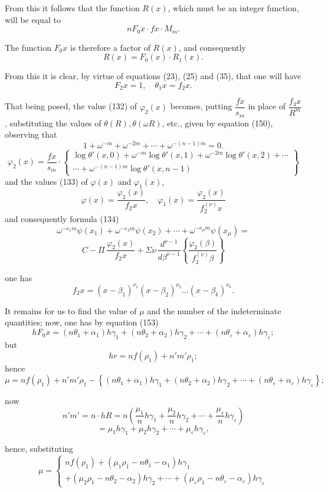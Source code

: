 \documentclass{article}
\begin{document}
From this it follows that the function $R(x)$, which must be an integer function, will be equal to
\[ n F_0 x \cdot f x \cdot M_m. \]

The function $F_0 x$ is therefore a factor of $R(x)$, and consequently
\[ R(x) = F_0(x) \cdot R_1(x). \tag{159} \]

From this it is clear, by virtue of equations (23), (25) and (35), that one will have
\[ F_2 x = 1, \quad \theta_1 x = f_2 x. \tag{160} \]

That being posed, the value (132) of $\varphi_2(x)$ becomes, putting $\dfrac{f x}{s_m}$ in place of $\dfrac{f_3 x}{R^{m}}$, substituting the values of $\theta(R), \theta(\omega R)$, etc., given by equation (150), observing that
\[ 1+\omega^{-m}+\omega^{-2m}+\cdots+\omega^{-(n-1)m} = 0. \]
\[ \varphi_2(x) = \frac{f x}{s_m} \cdot \left\{ \begin{array}{l} \log\theta'(x,0)+\omega^{-m}\log\theta'(x,1)+\omega^{-2m}\log\theta'(x,2)+\cdots \\ \cdots+\omega^{-(n-1)m}\log\theta'(x,n-1) \end{array} \right\} \tag{161} \]
and the values (133) of $\varphi(x)$ and $\varphi_1(x)$,
\[ \varphi(x) = \frac{\varphi_2(x)}{f_2 x}, \quad \varphi_1(x) = \frac{\varphi_2(x)}{f_2^{(\nu)}x} \]
and consequently formula (134)
\[ \omega^{-e_1 m}\psi(x_1)+\omega^{-e_2 m}\psi(x_2)+\cdots+\omega^{-e_\mu m}\psi(x_\mu) = \]
\[ C - \Pi\,\frac{\varphi_2(x)}{f_2 x} + \Sigma\nu\,\frac{d^{\nu-1}}{d\beta^{\nu-1}} \left\{ \frac{\varphi_2(\beta)}{f_2^{(\nu)}\beta} \right\} \tag{162} \]

one has
\[ f_2 x = (x-\beta_1)^{\nu_1}(x-\beta_2)^{\nu_2} \ldots (x-\beta_k)^{\nu_k}. \]

It remains for us to find the value of $\mu$ and the number of the indeterminate quantities; now, one has by equation (153)
\[ hF_0 x = (n\theta_1+\alpha_1)h\gamma_1+(n\theta_2+\alpha_2)h\gamma_2+\cdots+(n\theta_\varepsilon+\alpha_\varepsilon)h\gamma_\varepsilon; \tag{163} \]
but
\[ hr = nf(\rho_1) + n'm'\rho_1; \]
hence
\[ \mu = nf(\rho_1)+n'm'\rho_1-\left\{(n\theta_1+\alpha_1)h\gamma_1+(n\theta_2+\alpha_2)h\gamma_2+\cdots+(n\theta_\varepsilon+\alpha_\varepsilon)h\gamma_\varepsilon\right\}; \]

now
\[ n'm' = n \cdot hR = n\left(\frac{\mu_1}{n}h\gamma_1+\frac{\mu_2}{n}h\gamma_2+\cdots+\frac{\mu_\varepsilon}{n}h\gamma_\varepsilon\right) \]
\[ = \mu_1 h\gamma_1+\mu_2 h\gamma_2+\cdots+\mu_\varepsilon h\gamma_\varepsilon, \]

hence, substituting
\[ \mu = \begin{cases} nf(\rho_1)+(\mu_1\rho_1-n\theta_1-\alpha_1)h\gamma_1 \\ +(\mu_2\rho_1-n\theta_2-\alpha_2)h\gamma_2+\cdots+(\mu_\varepsilon\rho_1-n\theta_\varepsilon-\alpha_\varepsilon)h\gamma_\varepsilon \end{cases} \tag{164} \]
\end{document}
